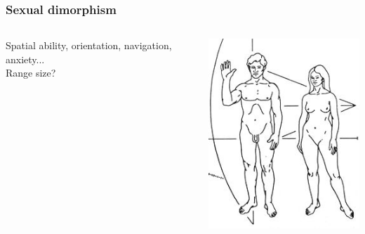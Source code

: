 \documentclass{beamer}
\begin{document}
\begin{frame}
\frametitle{Sexual dimorphism}

\begin{columns}
\begin{column}{.5\textwidth}

Spatial ability, orientation, navigation, anxiety... \\
\vspace{0.75cm}
Range size? \\

\end{column}

\begin{column}{.5\textwidth}
\includegraphics[width= 1\textwidth]{hum_di}
\end{column}

\end{columns}

\end{frame}

\end{document}
